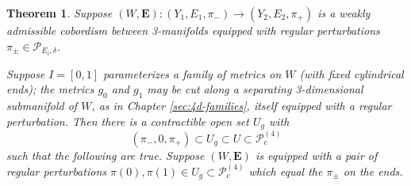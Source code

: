 \documentclass{memo-l}
\newtheorem{theorem}{Theorem}[chapter]
\theoremstyle{definition}
\theoremstyle{remark}
\numberwithin{section}{chapter}
\numberwithin{equation}{chapter}
\begin{document}
\begin{theorem}\label{FamilyPackage}Suppose $(W,\mathbf{E}): (Y_1, E_1, \pi_-) \to (Y_2, E_2, \pi_+)$ is a weakly admissible cobordism between 3-manifolds equipped with regular perturbations $\pi_\pm \in \mathcal P_{E_i, \delta}$.

Suppose $I = [0,1]$ parameterizes a family of metrics on $W$ (with fixed cylindrical ends); the metrics $g_0$ and $g_1$ may be cut along a separating 3-dimensional submanifold of $W$, as in Chapter \ref{sec:4d-families}, itself equipped with a regular perturbation. Then there is a contractible open set $U_g$ with
$$(\pi_-, 0, \pi_+) \subset U_g \subset U \subset \mathcal P^{(4)}_c$$ such that the following are true. Suppose $(W,\mathbf{E})$ is equipped with a pair of regular perturbations $\pi(0), \pi(1) \in U_g \subset \mathcal P^{(4)}_c$ which equal the $\pi_\pm$ on the ends.


\end{theorem}
\end{document}
